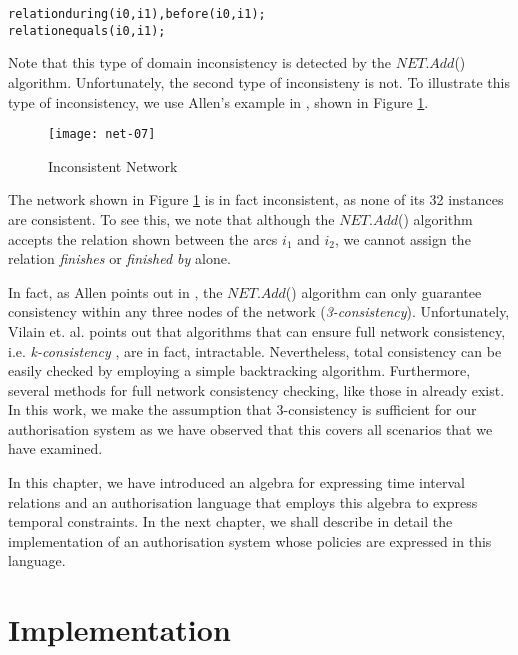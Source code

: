 \documentclass[11pt]{report}
\newenvironment{vverbatim}
{
  \begin{alltt}
}
{
  \vspace{-\baselineskip}
  \end{alltt}
}
\begin{document}
      \begin{vverbatim}
  relation during(i0, i1), before(i0, i1);
  relation equals(i0, i1);
      \end{vverbatim}

      Note that this type of domain inconsistency is detected by the
      $NET.Add$() algorithm. Unfortunately, the second type of inconsisteny is
      not. To illustrate this type of inconsistency, we use Allen's example in
      \cite{AL}, shown in Figure \ref{fig-net-ex-07}.

      \begin{figure}[[tbhp]
        \begin{center}
          \texttt{[image: net-07]}
          \caption{Inconsistent Network}
          \label{fig-net-ex-07}
        \end{center}
      \end{figure}

      The network shown in Figure \ref{fig-net-ex-07} is in fact inconsistent,
      as none of its 32 instances are consistent. To see this, we note that
      although the $NET.Add$() algorithm accepts the relation shown between the
      arcs $i_1$ and $i_2$, we cannot assign the relation {\em finishes} or
      {\em finished by} alone.

      In fact, as Allen points out in \cite{AL}, the $NET.Add$() algorithm can
      only guarantee consistency within any three nodes of the network
      ({\em 3-consistency}). Unfortunately, Vilain et. al. \cite{VI} points out
      that algorithms that can ensure full network consistency, i.e.
      {\em k-consistency} \cite{FR}, are in fact, intractable. Nevertheless,
      total consistency can be easily checked by employing a simple
      backtracking algorithm. Furthermore, several methods for full network
      consistency checking, like those in \cite{LA,VB} already exist. In this
      work, we make the assumption that 3-consistency is sufficient for our
      authorisation system as we have observed that this covers all scenarios
      that we have examined.

      In this chapter, we have introduced an algebra for expressing time
      interval relations and an authorisation language that employs this
      algebra to express temporal constraints. In the next chapter, we shall
      describe in detail the implementation of an authorisation system whose
      policies are expressed in this language.

  \chapter{Implementation}
\end{document}
